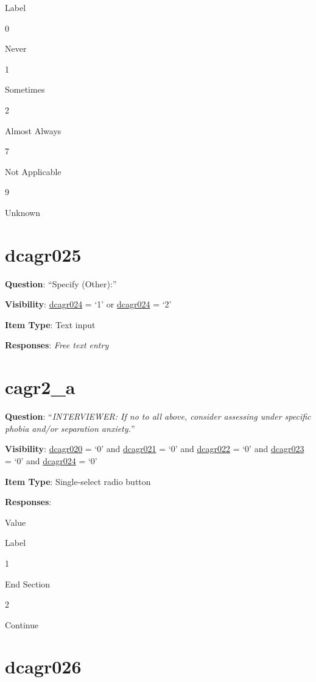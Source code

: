 \documentclass[]{book}
\begin{document}
Label

0

Never

1

Sometimes

2

Almost Always

7

Not Applicable

9

Unknown

\hypertarget{dcagr025}{%
\section{dcagr025}\label{dcagr025}}

\textbf{Question}: ``Specify (Other):''

\textbf{Visibility}: \protect\hyperlink{dcagr024}{dcagr024} = `1' or \protect\hyperlink{dcagr024}{dcagr024} = `2'

\textbf{Item Type}: Text input

\textbf{Responses}: \emph{Free text entry}

\hypertarget{cagr2_a}{%
\section{cagr2\_a}\label{cagr2_a}}

\textbf{Question}: ``\emph{INTERVIEWER: If no to all above, consider assessing under specific phobia and/or separation anxiety.}''

\textbf{Visibility}: \protect\hyperlink{dcagr020}{dcagr020} = `0' and \protect\hyperlink{dcagr021}{dcagr021} = `0' and \protect\hyperlink{dcagr022}{dcagr022} = `0' and \protect\hyperlink{dcagr023}{dcagr023} = `0' and \protect\hyperlink{dcagr024}{dcagr024} = `0'

\textbf{Item Type}: Single-select radio button

\textbf{Responses}:

Value

Label

1

End Section

2

Continue

\hypertarget{dcagr026}{%
\section{dcagr026}\label{dcagr026}}
\end{document}
